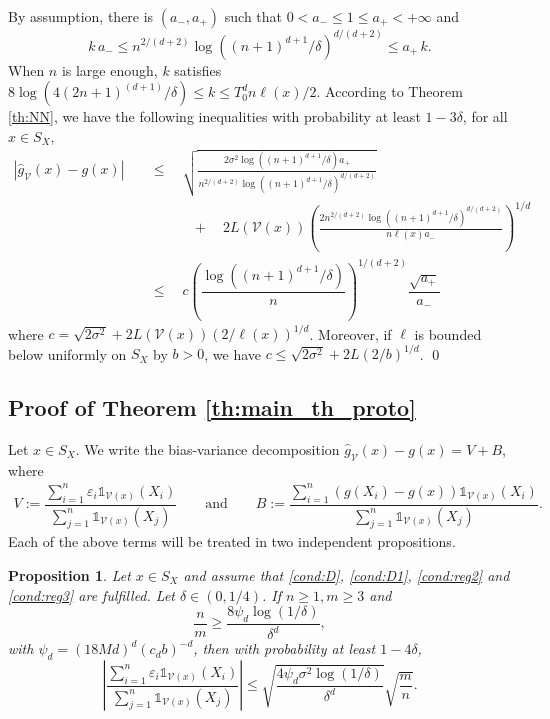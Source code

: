 \documentclass[paper=a4, fontsize=11pt]{scrartcl}
\newcommand{\ind}{\mathds{1}}
\newtheorem{proposition}[theorem]{Proposition}
\begin{document}
By assumption, there is $(a_-,a_+) $ such that $ 0< a _- \leq 1\leq   a _+ < +\infty $ and $$  k \, a_-  \leq n^{2/(d+2)} \log((n+1)^{d+1}/\delta)^{d/(d+2)} \leq a_ + \, k.$$
When $n$ is large enough, $k$ satisfies $ 8 \log( 4 (2n+1)^{(d+1)} / \delta) \leq k \leq T_0^d n \ell(x) / 2.$
According to Theorem \ref{th:NN}, we have the following inequalities with probability at least $1-3\delta$, for all $x\in S_X$, \begin{align*} | \hat g_{\mathcal V}(x) - g(x)| \quad &\leq \quad \sqrt{\frac{2\sigma^2\log ( {(n+1)^{d+1}/\delta })  a_+ }{ n^{2/(d+2)} \log((n+1)^{d+1}/\delta)^{d/(d+2)} }} \\ &\qquad \quad + \quad  2 L(\mathcal{V}(x)) \left( \frac{2 n^{2/(d+2)} \log((n+1)^{d+1}/\delta)^{d/(d+2)} }{n  \ell(x) a_- } \right)^{1/d} \\ &\leq \quad c \left( \dfrac{\log((n+1)^{d+1}/\delta)}{n}\right)^{1/(d+2)}  \dfrac{\sqrt{a_+}}{a_-}\end{align*} where $c = \sqrt{2\sigma^2} + 2 L(\mathcal{V}(x)) \left(2/\ell(x) \right)^{1/d}$.   Moreover, if $\ell$ is bounded below uniformly on $S_X$ by $b > 0$, we have $c\leq \sqrt{2\sigma^2} + 2 L \left(2/b\right)^{1/d}$. \qed    

     

\subsection*{Proof of Theorem \ref{th:main_th_proto}}

    Let \(x \in S_X\). We write the bias-variance decomposition 
$\hat g_{\mathcal V}(x) - g(x) = V + B$, where \begin{align*}
    V := \dfrac{\sum_{i=1}^n \varepsilon_i \ind_{ \mathcal V(x) }(X_i)}{\sum_{j=1}^n \ind_{ \mathcal V(x) }(X_j)} \qquad \text{and}\qquad
       B := \dfrac{\sum_{i=1}^n \left(g(X_i) - g(x)\right) \ind_{ \mathcal V(x) }(X_i)}{\sum_{j=1}^n \ind_{ \mathcal V(x) }(X_j)}.
\end{align*}
Each of the above terms will be treated in two independent propositions.


\begin{proposition}\label{prop_lemme}
    Let $x\in S_X$ and assume that \ref{cond:D}, \ref{cond:D1}, \ref{cond:reg2} and \ref{cond:reg3} are fulfilled.
Let $\delta \in (0,1/4)$. If $n \geq 1,m \geq 3$ and $$ \dfrac{n}{m} \geq \dfrac{ 8 \psi_d \log(1/\delta)}{ \delta^d},$$
with $\psi_d = (18Md)^d (c_d b)^{-d}$,
    then with probability at least $1- 4\delta$,
    $$\left| \dfrac{\sum_{i=1}^n \varepsilon_i \ind _{ \mathcal V(x) }(X_i)}{{\sum_{j=1}^n \ind _{ \mathcal V(x) }(X_j)}} \right| \leq\sqrt{\dfrac{ 4 \psi_d  \sigma^2   \log(1/\delta)}{\delta^d }} \sqrt{\dfrac{m}{n}}.$$   
\end{proposition}
\end{document}
